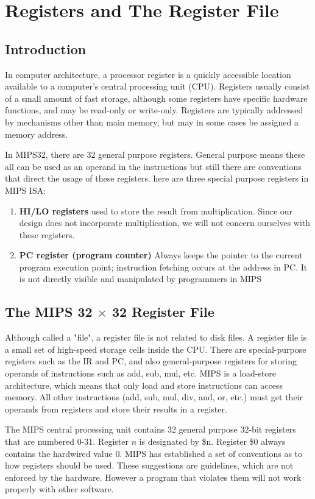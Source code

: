 \documentclass[12pt]{report}
\newcommand{\mychapter}[2]{
    \setcounter{chapter}{#1}
    \setcounter{section}{0}
    \chapter*{#2}
    \addcontentsline{toc}{chapter}{#2}
}
\begin{document}
   \mychapter{2}{Registers and The Register File}
   \section{Introduction}
   In computer architecture, a processor register is a quickly accessible location available to a computer's central processing unit (CPU). Registers usually consist of a small amount of fast storage, although some registers have specific hardware functions, and may be read-only or write-only. Registers are typically addressed by mechanisms other than main memory, but may in some cases be assigned a memory address.
   
   In MIPS32, there are 32 general purpose registers. General purpose means these all can be used as an operand in the instructions but still there are conventions that direct the usage of these registers. here are three special purpose registers in MIPS ISA:
   \begin{enumerate}[i]
   \item \textbf{HI/LO registers}  used to store the result from multiplication. Since our design does not incorporate multiplication, we will not concern ourselves with these registers.
   \item \textbf{PC register (program counter)}
    Always keeps the pointer to the current program execution point; instruction fetching occurs at the address in PC.
 It is not directly visible and manipulated by programmers in MIPS
   \end{enumerate}
    \section{The MIPS 32 $\times$ 32 Register File}
    Although called a "file", a register file is not related to disk files. A register file is a small set of high-speed storage cells inside the CPU. There are special-purpose registers such as the IR and PC, and also general-purpose registers for storing operands of instructions such as add, sub, mul, etc.
MIPS is a load-store architecture, which means that only load and store instructions can access memory. All other instructions (add, sub, mul, div, and, or, etc.) must get their operands from registers and store their results in a register.

    The MIPS central processing unit contains 32 general purpose 32-bit registers that are numbered 0-31. Register $n$ is designated by \$n. Register \$0 always contains the hardwired value 0. MIPS has established a set of conventions as to how registers should be used. These suggestions are guidelines, which are not enforced by the hardware. However a program that violates them will not work properly with other software. 
\end{document}
